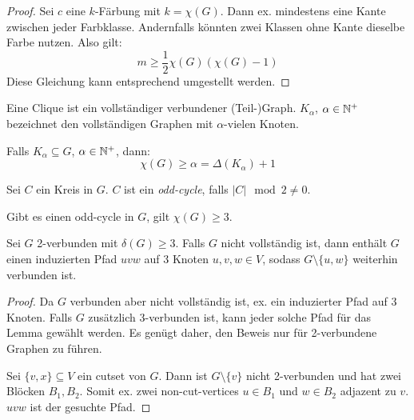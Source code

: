 \begin{proof}
    Sei $ c $ eine $ k $-Färbung mit $ k = \chi(G) $.
    Dann ex. mindestens eine Kante zwischen jeder Farbklasse.
    Andernfalls könnten zwei Klassen ohne Kante dieselbe Farbe nutzen.
    Also gilt:
    \begin{equation*}
        m \geq \frac{1}{2} \chi(G) (\chi(G) - 1)
    \end{equation*}
    Diese Gleichung kann entsprechend umgestellt werden.
\end{proof}

\begin{definition}[Clique]
    Eine Clique ist ein vollständiger verbundener (Teil-)Graph.
    $ K_\alpha $, $ \alpha \in \mathbb{N}^+ $ bezeichnet den vollständigen Graphen mit $ \alpha $-vielen Knoten.
\end{definition}

\begin{proposition}
    Falls $ K_\alpha \subseteq G $, $ \alpha \in \mathbb{N}^+ $, dann:
    \begin{equation*}
        \chi(G) \geq \alpha = \Delta(K_\alpha) + 1
    \end{equation*}
\end{proposition}

\begin{definition}
    Sei $ C $ ein Kreis in $ G $.
    $ C $ ist ein \textit{odd-cycle}, falls $ |C| \mod 2 \ne 0 $.
\end{definition}

\begin{proposition}
    Gibt es einen odd-cycle in $ G $, gilt $ \chi(G) \geq 3 $.
\end{proposition}

\begin{lemma}
    \label{lem:min-deg-3-connected}
    Sei $ G $ 2-verbunden mit $ \delta(G) \geq 3 $.
    Falls $ G $ nicht vollständig ist, dann enthält $ G $ einen induzierten Pfad  $uvw $ auf 3 Knoten $ u, v, w \in V $, sodass $ G \setminus \{ u, w \} $ weiterhin verbunden ist.
\end{lemma}

\begin{proof}
    Da $ G $ verbunden aber nicht vollständig ist, ex. ein induzierter Pfad auf 3 Knoten.
    Falls $ G $ zusätzlich 3-verbunden ist, kann jeder solche Pfad für das Lemma gewählt werden.
    Es genügt daher, den Beweis nur für 2-verbundene Graphen zu führen.

    Sei $ \{ v, x\} \subseteq V $ ein cutset von $ G $.
    Dann ist $ G \setminus \{ v \} $ nicht 2-verbunden und hat zwei Blöcken $ B_1, B_2 $.
    Somit ex. zwei non-cut-vertices $ u \in B_1 $ und $ w \in B_2 $ adjazent zu $ v $.
    $ uvw $ ist der gesuchte Pfad.
\end{proof}

